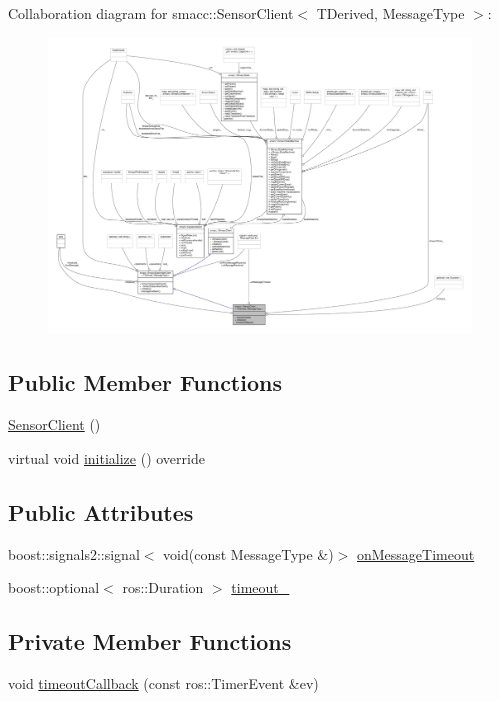 Collaboration diagram for smacc\+:\+:Sensor\+Client$<$ T\+Derived, Message\+Type $>$\+:
\nopagebreak
\begin{figure}[H]
\begin{center}
\leavevmode
\includegraphics[width=350pt]{classsmacc_1_1SensorClient__coll__graph}
\end{center}
\end{figure}
\subsection*{Public Member Functions}
\begin{DoxyCompactItemize}
\item 
\hyperlink{classsmacc_1_1SensorClient_a2326cef7e7bd14a614ef0ff64a96b6f7}{Sensor\+Client} ()
\item 
virtual void \hyperlink{classsmacc_1_1SensorClient_ab772bc1d3e1db37a39d3d1992b06cec2}{initialize} () override
\end{DoxyCompactItemize}
\subsection*{Public Attributes}
\begin{DoxyCompactItemize}
\item 
boost\+::signals2\+::signal$<$ void(const Message\+Type \&)$>$ \hyperlink{classsmacc_1_1SensorClient_afe39f412bfd61f8eac15ac218baa1567}{on\+Message\+Timeout}
\item 
boost\+::optional$<$ ros\+::\+Duration $>$ \hyperlink{classsmacc_1_1SensorClient_a1ad0b539c7ffa85327b3fb0e2bb1a6c3}{timeout\+\_\+}
\end{DoxyCompactItemize}
\subsection*{Private Member Functions}
\begin{DoxyCompactItemize}
\item 
void \hyperlink{classsmacc_1_1SensorClient_a02c408abe6a77357547778d552f6b165}{timeout\+Callback} (const ros\+::\+Timer\+Event \&ev)
\end{DoxyCompactItemize}
